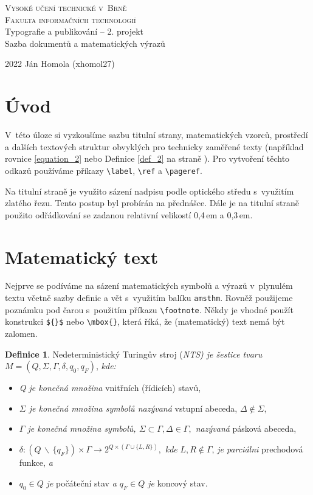\documentclass[a4paper, 11pt, twocolumn]{article}
\theoremstyle{definition}
\newtheorem{definition}{Definice}
\begin{document}
\begin{titlepage}
\begin{center}
    \Huge
    \textsc{{\Huge Vysoké učení technické v~Brně}\\
            {\huge Fakulta informačních technologií}}\\
    {\LARGE Typografie a publikování -- 2. projekt\\
    Sazba dokumentů a matematických výrazů}
\end{center}
{\Large 2022 \hfill Ján Homola (xhomol27)}
\end{titlepage}
    


\section*{Úvod}
V~této úloze si vyzkoušíme sazbu titulní strany, matematických vzorců, prostředí a dalších textových struktur obvyklých pro technicky zaměřené texty (například rovnice \eqref{equation_2} nebo Definice \ref{def_2} na straně \pageref{def_2}). Pro vytvoření těchto odkazů používáme příkazy \verb|\label|, \verb|\ref| a \verb|\pageref|. \par
Na titulní straně je využito sázení nadpisu podle optického středu s~využitím zlatého řezu. Tento postup byl probírán na přednášce. Dále je na titulní straně použito odřádkování se zadanou relativní velikostí 0,4\,em a 0,3\,em.

\section{Matematický text}
Nejprve se podíváme na sázení matematických symbolů a výrazů v~plynulém textu včetně sazby definic a vět s~využitím balíku \texttt{amsthm}. Rovněž použijeme poznámku pod čarou s~použitím příkazu \verb|\footnote|. Někdy je vhodné použít konstrukci \verb|${}$| nebo \verb|\mbox{}|, která říká, že (matematický) text nemá být zalomen. 

\begin{definition}
\label{def_1}
Nedeterministický Turingův stroj (\emph{NTS) je šestice tvaru} $M = (Q, \Sigma, \Gamma, \delta, q_0, q_F)$, \emph{kde:}
\begin{itemize}
    \item \emph{Q je konečná množina} vnitřních (řídicích) stavů, 
    \item \emph{$\Sigma$ je konečná množina symbolů nazývaná} vstupní abeceda, $\Delta \notin \Sigma,$
    \item \emph{$\Gamma$ je konečná množina symbolů, $\Sigma \subset \Gamma, \Delta \in \Gamma,$ nazývaná} pásková abeceda,
    \item  $\delta:(Q \,\backslash \,\{q_F\}) \times \Gamma \rightarrow 2^{Q \times(\Gamma \cup\{L, R\})},$ \emph{kde} $L, R \notin \Gamma$, \emph{je parciálni} prechodová funkce, \emph{a}
    \item $q_0 \in Q$ \emph{je} počáteční stav \emph{a $q_F \in Q$ je} koncový stav.
\end{itemize}
\end{definition}
\end{document}
